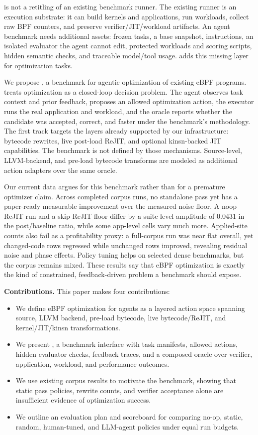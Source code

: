 \sys is not a retitling of an existing benchmark runner. The existing runner is an execution substrate: it can build kernels and applications, run workloads, collect raw BPF counters, and preserve verifier/JIT/workload artifacts. An agent benchmark needs additional assets: frozen tasks, a base snapshot, instructions, an isolated evaluator the agent cannot edit, protected workloads and scoring scripts, hidden semantic checks, and traceable model/tool usage. \sys adds this missing layer for optimization tasks.

We propose \sys, a benchmark for agentic optimization of existing eBPF programs. \sys treats optimization as a closed-loop decision problem. The agent observes task context and prior feedback, proposes an allowed optimization action, the executor runs the real application and workload, and the oracle reports whether the candidate was accepted, correct, and faster under the benchmark's methodology. The first \sys track targets the layers already supported by our infrastructure: bytecode rewrites, live post-load ReJIT, and optional kinsn-backed JIT capabilities. The benchmark is not defined by those mechanisms. Source-level, LLVM-backend, and pre-load bytecode transforms are modeled as additional action adapters over the same oracle.

Our current data argues for this benchmark rather than for a premature optimizer claim. Across completed corpus runs, no standalone pass yet has a paper-ready measurable improvement over the measured noise floor. A noop ReJIT run and a skip-ReJIT floor differ by a suite-level amplitude of 0.0431 in the post/baseline ratio, while some app-level cells vary much more. Applied-site counts also fail as a profitability proxy: a full-corpus run was near flat overall, yet changed-code rows regressed while unchanged rows improved, revealing residual noise and phase effects. Policy tuning helps on selected dense benchmarks, but the corpus remains mixed. These results say that eBPF optimization is exactly the kind of constrained, feedback-driven problem a benchmark should expose.

\noindent\textbf{Contributions.} This paper makes four contributions:
\begin{itemize}
  \item We define eBPF optimization for agents as a layered action space spanning source, LLVM backend, pre-load bytecode, live bytecode/ReJIT, and kernel/JIT/kinsn transformations.
  \item We present \sys, a benchmark interface with task manifests, allowed actions, hidden evaluator checks, feedback traces, and a composed oracle over verifier, application, workload, and performance outcomes.
  \item We use existing corpus results to motivate the benchmark, showing that static pass policies, rewrite counts, and verifier acceptance alone are insufficient evidence of optimization success.
  \item We outline an evaluation plan and scoreboard for comparing no-op, static, random, human-tuned, and LLM-agent policies under equal run budgets.
\end{itemize}
